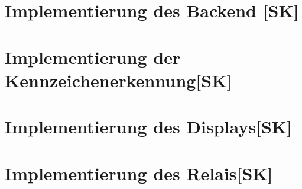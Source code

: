 \section{Implementierung des Backend [SK]}

\section{Implementierung der Kennzeichenerkennung[SK]}

\section{Implementierung des Displays[SK]}

\section{Implementierung des Relais[SK]}
